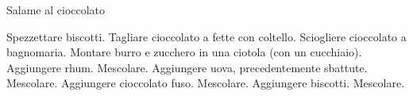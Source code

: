 \begin{recipe}{Salame al cioccolato}
    \begin{header}[
        \portion{6+}
        \source{Internet}
        \recipedate{\tilde 2019}
    
        \preparationTime{\timeH{1}}
        \preparationWait{\tilde \timeH{8}}[Frigo]
    \end{header}
    
    \begin{ingredients}[5]
    \end{ingredients}
    
    \begin{preparation}
        \step Spezzettare biscotti.
        \step Tagliare cioccolato a fette con coltello.
        \step Sciogliere cioccolato a bagnomaria.
        \step Montare burro e zucchero in una ciotola (con un cucchiaio).
        \step Aggiungere rhum. Mescolare.
        \step Aggiungere uova, precedentemente sbattute. Mescolare.
        \step Aggiungere cioccolato fuso. Mescolare.
        \step Aggiungere biscotti. Mescolare.
    \end{preparation}
\end{recipe}
